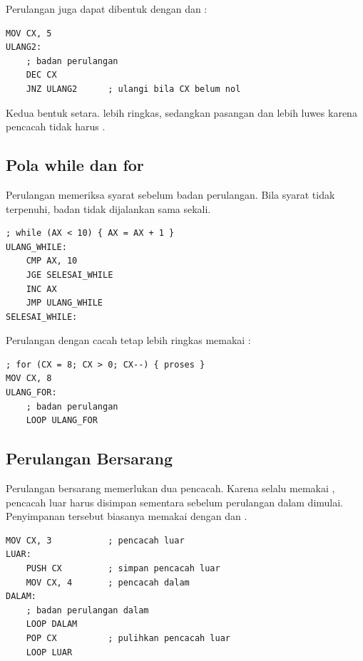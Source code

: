 Perulangan juga dapat dibentuk dengan  dan :

\begin{lstlisting}[language=MASM, numbers=none]
MOV CX, 5
ULANG2:
    ; badan perulangan
    DEC CX
    JNZ ULANG2      ; ulangi bila CX belum nol
\end{lstlisting}

Kedua bentuk setara.  lebih ringkas, sedangkan pasangan
 dan  lebih luwes karena pencacah tidak harus
.

\subsection{Pola while dan for}

Perulangan  memeriksa syarat sebelum badan perulangan.
Bila syarat tidak terpenuhi, badan tidak dijalankan sama sekali.

\begin{lstlisting}[language=MASM, numbers=none]
; while (AX < 10) { AX = AX + 1 }
ULANG_WHILE:
    CMP AX, 10
    JGE SELESAI_WHILE
    INC AX
    JMP ULANG_WHILE
SELESAI_WHILE:
\end{lstlisting}

Perulangan  dengan cacah tetap lebih ringkas memakai
:

\begin{lstlisting}[language=MASM, numbers=none]
; for (CX = 8; CX > 0; CX--) { proses }
MOV CX, 8
ULANG_FOR:
    ; badan perulangan
    LOOP ULANG_FOR
\end{lstlisting}

\subsection{Perulangan Bersarang}

Perulangan bersarang memerlukan dua pencacah. Karena 
selalu memakai , pencacah luar harus disimpan sementara
sebelum perulangan dalam dimulai. Penyimpanan tersebut biasanya
memakai  dengan  dan .

\begin{lstlisting}[language=MASM, numbers=none]
MOV CX, 3           ; pencacah luar
LUAR:
    PUSH CX         ; simpan pencacah luar
    MOV CX, 4       ; pencacah dalam
DALAM:
    ; badan perulangan dalam
    LOOP DALAM
    POP CX          ; pulihkan pencacah luar
    LOOP LUAR
\end{lstlisting}

